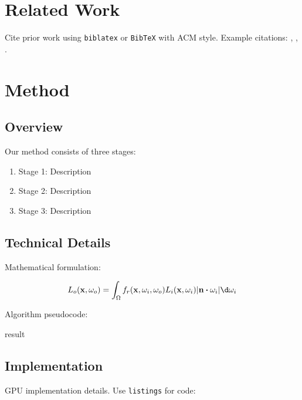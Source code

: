 \documentclass[sigconf,review,anonymous]{acmart}
\begin{document}
\section{Related Work}
\label{sec:related}

Cite prior work using \texttt{biblatex} or \texttt{BibTeX} with ACM style.
Example citations: \cite{knuth1984texbook}, \cite{whitted1980improved},
\cite{akanine2018realtime}.

\section{Method}
\label{sec:method}

\subsection{Overview}
\label{sec:overview}

Our method consists of three stages:
\begin{enumerate}
    \item Stage 1: Description
    \item Stage 2: Description
    \item Stage 3: Description
\end{enumerate}

\subsection{Technical Details}
\label{sec:technical}

Mathematical formulation:

\begin{equation}\label{eq:method}
L_o(\vb{x}, \omega_o) = \int_{\Omega} f_r(\vb{x}, \omega_i, \omega_o) L_i(\vb{x}, \omega_i) \abs{\vb{n} \vdot \omega_i} \d\omega_i
\end{equation}

Algorithm pseudocode:

\begin{algorithm}[htbp]
\caption{Our Algorithm}\label{alg:ours}
\Return result
\end{algorithm}

\subsection{Implementation}
\label{sec:impl}

GPU implementation details. Use \texttt{listings} for code:
\end{document}
